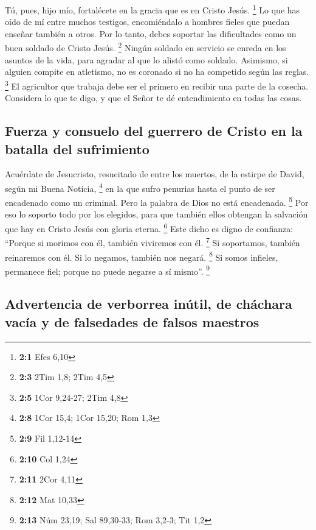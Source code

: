  Tú, pues, hijo mío, fortalécete en la gracia que es en
Cristo Jesús. \footnote{\textbf{2:1} Efes 6,10}  Lo que
has oído de mí entre muchos testigos, encomiéndalo a hombres fieles que
puedan enseñar también a otros.  Por lo tanto, debes
soportar las dificultades como un buen soldado de Cristo Jesús.
\footnote{\textbf{2:3} 2Tim 1,8; 2Tim 4,5}  Ningún soldado
en servicio se enreda en los asuntos de la vida, para agradar al que lo
alistó como soldado.  Asimismo, si alguien compite en
atletismo, no es coronado si no ha competido según las reglas.
\footnote{\textbf{2:5} 1Cor 9,24-27; 2Tim 4,8}  El
agricultor que trabaja debe ser el primero en recibir una parte de la
cosecha.  Considera lo que te digo, y que el Señor te dé
entendimiento en todas las cosas.

\hypertarget{fuerza-y-consuelo-del-guerrero-de-cristo-en-la-batalla-del-sufrimiento}{%
\subsection{Fuerza y \hspace{0pt}\hspace{0pt}consuelo del guerrero de
Cristo en la batalla del
sufrimiento}\label{fuerza-y-consuelo-del-guerrero-de-cristo-en-la-batalla-del-sufrimiento}}

 Acuérdate de Jesucristo, resucitado de entre los muertos,
de la estirpe de David, según mi Buena Noticia, \footnote{\textbf{2:8}
  1Cor 15,4; 1Cor 15,20; Rom 1,3}  en la que sufro
penurias hasta el punto de ser encadenado como un criminal. Pero la
palabra de Dios no está encadenada. \footnote{\textbf{2:9} Fil 1,12-14}
 Por eso lo soporto todo por los elegidos, para que
también ellos obtengan la salvación que hay en Cristo Jesús con gloria
eterna. \footnote{\textbf{2:10} Col 1,24}  Este dicho es
digno de confianza: ``Porque si morimos con él, también viviremos con
él. \footnote{\textbf{2:11} 2Cor 4,11}  Si soportamos,
también reinaremos con él. Si lo negamos, también nos negará.
\footnote{\textbf{2:12} Mat 10,33}  Si somos infieles,
permanece fiel; porque no puede negarse a sí mismo''. \footnote{\textbf{2:13}
  Núm 23,19; Sal 89,30-33; Rom 3,2-3; Tit 1,2}

\hypertarget{advertencia-de-verborrea-inuxfatil-de-chuxe1chara-vacuxeda-y-de-falsedades-de-falsos-maestros}{%
\subsection{Advertencia de verborrea inútil, de cháchara vacía y de
falsedades de falsos
maestros}\label{advertencia-de-verborrea-inuxfatil-de-chuxe1chara-vacuxeda-y-de-falsedades-de-falsos-maestros}}


